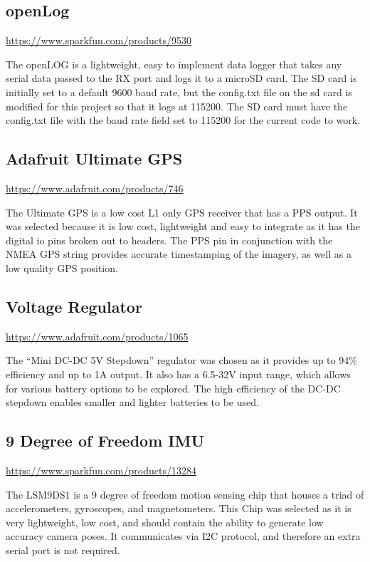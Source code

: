 \subsection{openLog}

\url{https://www.sparkfun.com/products/9530}\vspace{0.5em}

The openLOG is a lightweight, easy to implement data logger that takes any serial data passed to the RX port and logs it to a microSD card.  The SD card is initially set to a default 9600 baud rate, but the config.txt file on the sd card is modified for this project so that it logs at 115200.  The SD card must have the config.txt file with the baud rate field set to 115200 for the current code to work.
\subsection{Adafruit Ultimate GPS}

\url{https://www.adafruit.com/products/746}\vspace{0.5em}

The Ultimate GPS is a low cost L1 only GPS receiver that has a PPS output.  It was selected because it is low cost, lightweight and easy to integrate as it has the digital io pins broken out to headers.  The PPS pin in conjunction with the NMEA GPS string provides accurate timestamping of the imagery, as well as a low quality GPS position.
\subsection{Voltage Regulator}

\url{https://www.adafruit.com/products/1065}\vspace{0.5em}

The ``Mini DC-DC 5V Stepdown'' regulator was chosen as it provides up to 94\% efficiency and up to 1A output.  It also has a 6.5-32V input range, which allows for various battery options to be explored.  The high efficiency of the DC-DC stepdown enables smaller and lighter batteries to be used.
\subsection{9 Degree of Freedom IMU}

\url{https://www.sparkfun.com/products/13284}\vspace{0.5em}

The LSM9DS1 is a 9 degree of freedom motion sensing chip that houses a triad of accelerometers, gyroscopes, and magnetometers.  This Chip was selected as it is very lightweight, low cost, and should contain the ability to generate low accuracy camera poses.  It communicates via I2C protocol, and therefore an extra serial port is not required.
